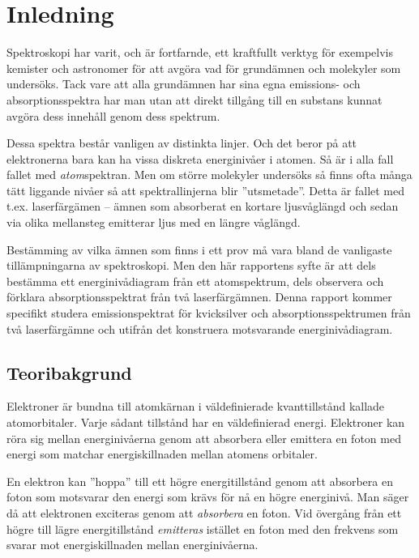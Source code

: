 \documentclass[11pt,a4paper]{article}
\begin{document}





\section{Inledning}
Spektroskopi har varit, och är fortfarnde, ett kraftfullt verktyg för
exempelvis kemister och astronomer för att avgöra vad för grundämnen
och molekyler som undersöks. Tack vare att alla grundämnen har sina
egna emissions- och absorptionsspektra har man utan att direkt
tillgång till en substans kunnat avgöra dess innehåll genom dess
spektrum. 

Dessa spektra består vanligen av distinkta linjer. Och det beror på
att elektronerna bara kan ha vissa diskreta energinivåer i atomen. Så
är i alla fall fallet med \emph{atom}spektran. Men om större molekyler
undersöks så finns ofta många tätt liggande nivåer så att
spektrallinjerna blir ''utsmetade''. Detta är fallet med
t.ex. laserfärgämen -- ämnen som absorberat en kortare ljusvåglängd
och sedan via olika mellansteg emitterar ljus med en längre våglängd.

Bestämming av vilka ämnen som finns i ett prov må vara bland de
vanligaste tillämpningarna av spektroskopi. Men den här rapportens
syfte är att dels bestämma ett energinivådiagram från ett
atomspektrum, dels observera och förklara absorptionsspektrat från två
laserfärgämnen.  Denna rapport kommer specifikt studera
emissionspektrat för kvicksilver\footnotemark{} och
absorptionsspektrumen från två laserfärgämne och utifrån det
konstruera motsvarande energinivådiagram. 


\subsection{Teoribakgrund}
Elektroner är bundna till atomkärnan i väldefinierade kvanttillstånd
kallade atomorbitaler. Varje sådant tillstånd har en väldefinierad
energi. Elektroner kan röra sig mellan energinivåerna genom att
absorbera eller emittera en foton med energi som matchar 
energiskillnaden mellan atomens orbitaler. 

En elektron kan ''hoppa'' till ett högre energitillstånd genom att
absorbera en foton som motsvarar den energi som krävs för nå en högre
energinivå. Man säger då att elektronen exciteras genom att
\emph{absorbera} en foton. Vid övergång från ett högre till lägre
energitillstånd \emph{emitteras} istället en foton med den frekvens
som svarar mot energiskillnaden mellan energinivåerna. 
 
\end{document}
